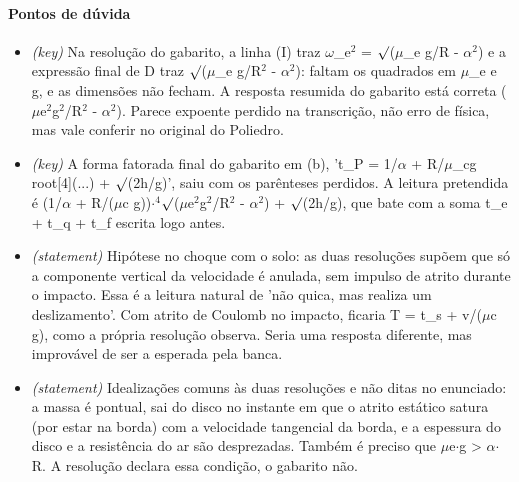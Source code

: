 \documentclass{article}%
\begin{document}
\paragraph{Pontos de dúvida}%
\begin{itemize}%
\item%
\textit{(key)} Na resolução do gabarito, a linha (I) traz $\omega$\_e$^2$ = $\surd$($\mu$\_e g/R - $\alpha$$^2$) e a expressão final de D traz $\surd$($\mu$\_e g/R$^2$ - $\alpha$$^2$): faltam os quadrados em $\mu$\_e e g, e as dimensões não fecham. A resposta resumida do gabarito está correta ($\mu$e$^2$g$^2$/R$^2$ - $\alpha$$^2$). Parece expoente perdido na transcrição, não erro de física, mas vale conferir no original do Poliedro.%
\item%
\textit{(key)} A forma fatorada final do gabarito em (b), 't\_P = 1/$\alpha$ + R/$\mu$\_cg root{[}4{]}(...) + $\surd$(2h/g)', saiu com os parênteses perdidos. A leitura pretendida é (1/$\alpha$ + R/($\mu$c g))$\cdot$$^{4}$$\surd$($\mu$e$^2$g$^2$/R$^2$ - $\alpha$$^2$) + $\surd$(2h/g), que bate com a soma t\_e + t\_q + t\_f escrita logo antes.%
\item%
\textit{(statement)} Hipótese no choque com o solo: as duas resoluções supõem que só a componente vertical da velocidade é anulada, sem impulso de atrito durante o impacto. Essa é a leitura natural de 'não quica, mas realiza um deslizamento'. Com atrito de Coulomb no impacto, ficaria T = t\_s + v/($\mu$c g), como a própria resolução observa. Seria uma resposta diferente, mas improvável de ser a esperada pela banca.%
\item%
\textit{(statement)} Idealizações comuns às duas resoluções e não ditas no enunciado: a massa é pontual, sai do disco no instante em que o atrito estático satura (por estar na borda) com a velocidade tangencial da borda, e a espessura do disco e a resistência do ar são desprezadas. Também é preciso que $\mu$e$\cdot$g > $\alpha$$\cdot$R. A resolução declara essa condição, o gabarito não.%
\end{itemize}%
\end{document}
